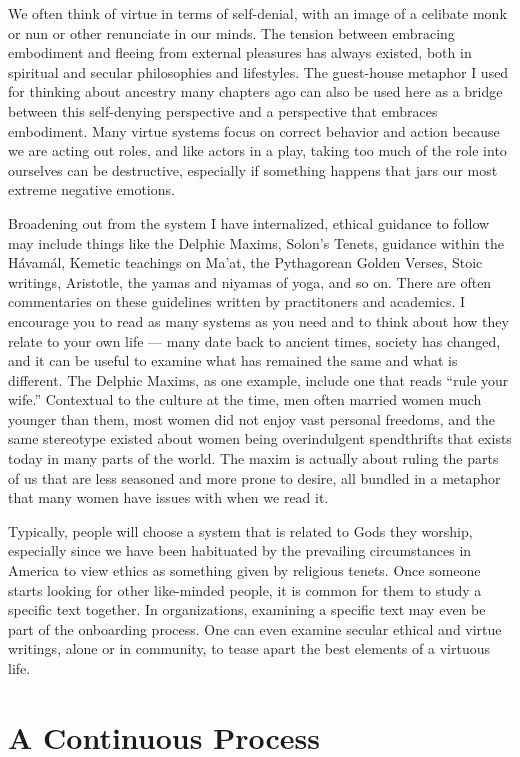 \documentclass[
]{book}
\begin{document}
We often think of virtue in terms of self-denial, with an image of a celibate monk or nun or other renunciate in our minds. The tension between embracing embodiment and fleeing from external pleasures has always existed, both in spiritual and secular philosophies and lifestyles. The guest-house metaphor I used for thinking about ancestry many chapters ago can also be used here as a bridge between this self-denying perspective and a perspective that embraces embodiment. Many virtue systems focus on correct behavior and action because we are acting out roles, and like actors in a play, taking too much of the role into ourselves can be destructive, especially if something happens that jars our most extreme negative emotions.

Broadening out from the system I have internalized, ethical guidance to follow may include things like the Delphic Maxims, Solon's Tenets, guidance within the Hávamál, Kemetic teachings on Ma'at, the Pythagorean Golden Verses, Stoic writings, Aristotle, the yamas and niyamas of yoga, and so on. There are often commentaries on these guidelines written by practitoners and academics. I encourage you to read as many systems as you need and to think about how they relate to your own life --- many date back to ancient times, society has changed, and it can be useful to examine what has remained the same and what is different. The Delphic Maxims, as one example, include one that reads ``rule your wife.'' Contextual to the culture at the time, men often married women much younger than them, most women did not enjoy vast personal freedoms, and the same stereotype existed about women being overindulgent spendthrifts that exists today in many parts of the world. The maxim is actually about ruling the parts of us that are less seasoned and more prone to desire, all bundled in a metaphor that many women have issues with when we read it.

Typically, people will choose a system that is related to Gods they worship, especially since we have been habituated by the prevailing circumstances in America to view ethics as something given by religious tenets. Once someone starts looking for other like-minded people, it is common for them to study a specific text together. In organizations, examining a specific text may even be part of the onboarding process. One can even examine secular ethical and virtue writings, alone or in community, to tease apart the best elements of a virtuous life.

\hypertarget{a-continuous-process}{%
\section{A Continuous Process}\label{a-continuous-process}}
\end{document}
